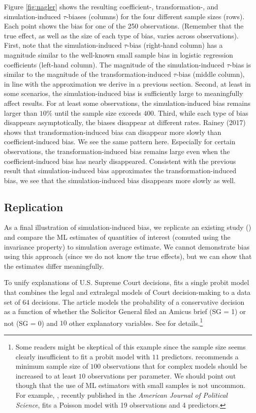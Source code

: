 \documentclass[11pt]{article}
\begin{document}
Figure \ref{fig:nagler} shows the resulting coefficient-, transformation-, and simulation-induced $\tau$-biases (columns) for the four different sample sizes (rows).
Each point shows the bias for one of the 250 observations. (Remember that the true effect, as well as the size of each type of bias, varies across observations).
First, note that the simulation-induced $\tau$-bias (right-hand column) has a magnitude similar to the well-known small sample bias in logistic regression coefficients (left-hand column).
The magnitude of the simulation-induced $\tau$-bias is similar to the magnitude of the transformation-induced $\tau$-bias (middle column), in line with the approximation we derive in a previous section.
Second, at least in some scenarios, the simulation-induced bias is sufficiently large to meaningfully affect results.
For at least some observations, the simulation-induced bias remains larger than $10\%$ until the sample size exceeds $400$.
Third, while each type of bias disappears asymptotically, the biases disappear at different rates.
Rainey (2017) shows that transformation-induced bias can disappear more slowly than coefficient-induced bias.
We see the same pattern here.
Especially for certain observations, the transformation-induced bias remains large even when the coefficient-induced bias has nearly disappeared.
Consistent with the previous result that simulation-induced bias approximates the transformation-induced bias, we see that the simulation-induced bias disappears more slowly as well.

\subsection*{Replication}

As a final illustration of simulation-induced bias, we replicate an existing study (\citealt{GeorgeEpstein1992}) and compare the ML estimates of quantities of interest (comuted using the invariance property) to simulation average estimate.
We cannot demonstrate bias using this approach (since we do not know the true effects), but we can show that the estimates differ meaningfully.

To unify explanations of U.S. Supreme Court decisions, \cite{GeorgeEpstein1992} fits a single probit model that combines the legal and extralegal models of Court decision-making to a data set of $64$ decisions.
The article models the probability of a conservative decision as a function of whether the Solicitor General filed an Amicus brief (SG = 1) or not (SG = 0) and $10$ other explanatory variables.
See \cite{GeorgeEpstein1992} for details.\footnote{Some readers might be skeptical of this example since the sample size seems clearly insufficient to fit a probit model with $11$ predictors. \citet[3.5.1]{Long1997} recommends a minimum sample size of $100$ observations that for complex models should be increased to at least $10$ observations per parameter. We should point out though that the use of ML estimators with small samples is not uncommon. For example, \cite{Holland2015}, recently published in the \emph{American Journal of Political Science}, fits a Poisson model with 19 observations and 4 predictors.}
\end{document}
